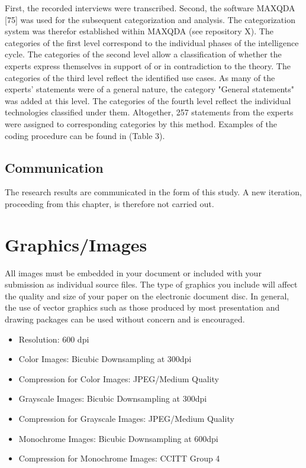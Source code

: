 \documentclass[10pt]{article}
\begin{document}
First, the recorded interviews were transcribed. Second, the software 
MAXQDA [75] was used for the subsequent categorization and analysis. 
The categorization system was therefor established within MAXQDA 
(see repository X). The categories of the first level correspond to 
the individual phases of the intelligence cycle. The categories of the 
second level allow a classification of whether the experts express 
themselves in support of or in contradiction to the theory. The 
categories of the third level reflect the identified use cases. 
As many of the experts' statements were of a general nature, the 
category "General statements" was added at this level. The categories 
of the fourth level reflect the individual technologies classified 
under them. Altogether, 257 statements from the experts were assigned 
to corresponding categories by this method. Examples of the coding 
procedure can be found in (Table 3).

\subsection{Communication}

The research results are communicated in the form of this study. 
A new iteration, proceeding from this chapter, is therefore not 
carried out.

\section{Graphics/Images}

All images must be embedded in your document or included with your submission as individual source files. The type of graphics you include will affect the quality and size of your paper on the electronic document disc. In general, the use of vector graphics such as those produced by most presentation and drawing packages can be used without concern and is encouraged.

\begin{itemize}
    \item Resolution: 600 dpi
    \item Color Images: Bicubic Downsampling at 300dpi
    \item Compression for Color Images: JPEG/Medium Quality
    \item Grayscale Images: Bicubic Downsampling at 300dpi
    \item Compression for Grayscale Images: JPEG/Medium Quality
    \item Monochrome Images: Bicubic Downsampling at 600dpi
    \item Compression for Monochrome Images: CCITT Group 4
\end{itemize}
\end{document}
